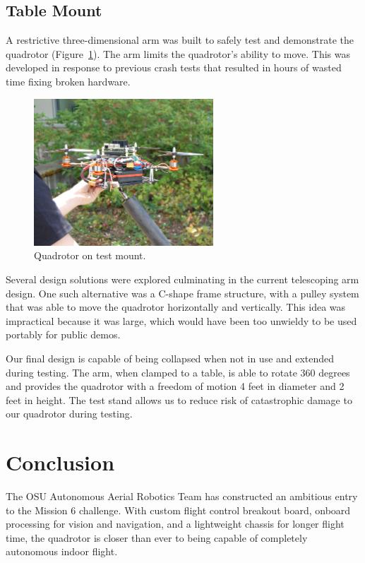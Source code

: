 \documentclass[12pt,letterpaper]{article} \usepackage[margin=1in]{geometry}
\begin{document}
\subsection*{Table Mount}

A restrictive three-dimensional arm was built to safely test and demonstrate
the quadrotor (Figure~\ref{fig:quad_test_mount}). The arm limits the
quadrotor's ability to move. This was developed in response to previous crash
tests that resulted in hours of wasted time fixing broken hardware.

\begin{figure}[!h]
	\centering
	\includegraphics[width=0.6\textwidth]{img/quad_test_mount.jpg}
	\caption{Quadrotor on test mount.}
	\label{fig:quad_test_mount}
\end{figure}

Several design solutions were explored culminating in the current telescoping
arm design. One such alternative was a C-shape frame structure, with a pulley
system that was able to move the quadrotor horizontally and vertically. This
idea was impractical because it was large, which would have been too unwieldy
to be used portably for public demos.

Our final design is capable of being collapsed when not in use and extended
during testing. The arm, when clamped to a table, is able to rotate 360 degrees
and provides the quadrotor with a freedom of motion 4 feet in diameter and
2 feet in height. The test stand allows us to reduce risk of catastrophic
damage to our quadrotor during testing.



\section*{Conclusion}

The OSU Autonomous Aerial Robotics Team has constructed an ambitious entry to
the Mission 6 challenge. With custom flight control breakout board, onboard
processing for vision and navigation, and a lightweight chassis for longer
flight time, the quadrotor is closer than ever to being capable of completely
autonomous indoor flight.
\end{document}

